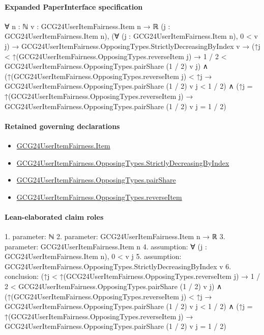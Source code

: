 \documentclass[10pt]{article}
\begin{document}
\paragraph{Expanded PaperInterface specification}
\begin{ReviewVerbatim}
∀ {n : ℕ} {v : GCG24UserItemFairness.Item n → ℝ} (j : GCG24UserItemFairness.Item n),
  (∀ (j : GCG24UserItemFairness.Item n), 0 < v j) →
    GCG24UserItemFairness.OpposingTypes.StrictlyDecreasingByIndex v →
      (↑j < ↑(GCG24UserItemFairness.OpposingTypes.reverseItem j) →
          1 / 2 < GCG24UserItemFairness.OpposingTypes.pairShare (1 / 2) v j) ∧
        (↑(GCG24UserItemFairness.OpposingTypes.reverseItem j) < ↑j →
            GCG24UserItemFairness.OpposingTypes.pairShare (1 / 2) v j < 1 / 2) ∧
          (↑j = ↑(GCG24UserItemFairness.OpposingTypes.reverseItem j) →
            GCG24UserItemFairness.OpposingTypes.pairShare (1 / 2) v j = 1 / 2)
\end{ReviewVerbatim}

\paragraph{Retained governing declarations}
\begin{itemize}\raggedright
\item \hyperlink{governing-declaration-a7c560a429c6e204}{GCG24\allowbreak{}User\allowbreak{}Item\allowbreak{}Fairness.\allowbreak{}Item}
\item \hyperlink{governing-declaration-8278344d2ddef9a8}{GCG24\allowbreak{}User\allowbreak{}Item\allowbreak{}Fairness.\allowbreak{}Opposing\allowbreak{}Types.\allowbreak{}Strictly\allowbreak{}Decreasing\allowbreak{}By\allowbreak{}Index}
\item \hyperlink{governing-declaration-1663e30d856ccba9}{GCG24\allowbreak{}User\allowbreak{}Item\allowbreak{}Fairness.\allowbreak{}Opposing\allowbreak{}Types.\allowbreak{}pair\allowbreak{}Share}
\item \hyperlink{governing-declaration-c12a8e29d370ae70}{GCG24\allowbreak{}User\allowbreak{}Item\allowbreak{}Fairness.\allowbreak{}Opposing\allowbreak{}Types.\allowbreak{}reverse\allowbreak{}Item}
\end{itemize}
\paragraph{Lean-elaborated claim roles}\begin{ReviewVerbatim}
1. parameter: ℕ
2. parameter: GCG24UserItemFairness.Item n → ℝ
3. parameter: GCG24UserItemFairness.Item n
4. assumption: ∀ (j : GCG24UserItemFairness.Item n), 0 < v j
5. assumption: GCG24UserItemFairness.OpposingTypes.StrictlyDecreasingByIndex v
6. conclusion: (↑j < ↑(GCG24UserItemFairness.OpposingTypes.reverseItem j) →
    1 / 2 < GCG24UserItemFairness.OpposingTypes.pairShare (1 / 2) v j) ∧
  (↑(GCG24UserItemFairness.OpposingTypes.reverseItem j) < ↑j →
      GCG24UserItemFairness.OpposingTypes.pairShare (1 / 2) v j < 1 / 2) ∧
    (↑j = ↑(GCG24UserItemFairness.OpposingTypes.reverseItem j) →
      GCG24UserItemFairness.OpposingTypes.pairShare (1 / 2) v j = 1 / 2)
\end{ReviewVerbatim}
\end{document}
